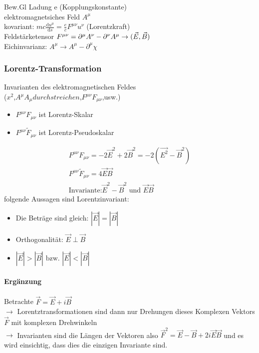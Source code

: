\documentclass[a4paper]{article}
\begin{document}
Bew.Gl
Ladung e (Kopplungskonstante)\\
elektromagnetsiches Feld $A^\mu$\\
kovariant: $mc\frac{\mathrm{d}u^\mu}{\mathrm{d}s}=\frac{e}{c} F^{\mu\nu} u^\nu$ (Lorentzkraft)\\
Feldstärketensor $F^{\mu\nu}=\partial^\mu A^\nu-\partial^\nu A^\mu \\
\rightarrow (\vec{E},\vec{B})$\\
Eichinvarianz: $A^\mu\rightarrow A^\mu-\partial^\mu\chi$\\
\subsubsection{Lorentz-Transformation}
Invarianten des elektromagnetischen Feldes\\
($x^2$,$A^\mu A_\mu durchstreichen$,$F^{\mu\nu}F_{\mu\nu}$,usw.)\\
\begin{itemize}
  \item $F^{\mu\nu}F_{\mu\nu}$ ist Lorentz-Skalar
  \item $F^{\mu\nu}\tilde{F}_{\mu\nu}$ ist Lorentz-Pseudoskalar
\end{itemize}
\begin{align}
F^{\mu\nu}F_{\mu\nu}=-2\vec{E}^2+2\vec{B}^2=-2(\vec{E^2}-\vec{B}^2)\\
F^{\mu\nu}\tilde{F}_{\mu\nu}=4\vec{E}\vec{B}\\
\text{Invariante:} \vec{E}^2-\vec{B}^2 \text{ und } \vec{E}\vec{B}
\end{align}
folgende Aussagen sind Lorentzinvariant:
\begin{itemize}
  \item Die Beträge sind gleich: $|\vec{E}|=|\vec{B}|$
  \item Orthogonalität: $\vec{E} \perp \vec{B}$
  \item $|\vec{E}|>|\vec{B}| \text{ bzw. } |\vec{E}|<|\vec{B}|$
\end{itemize}
\paragraph{Ergänzung}
Betrachte $\vec{F}=\vec{E}+i\vec{B}$\\
$\rightarrow$ Lorentztransformationen sind dann nur Drehungen dieses Komplexen
Vektors $\vec{F}$ mit komplexen Drehwinkeln\\
$\rightarrow$ Invarianten sind die Längen der Vektoren also
$\vec{F}^2=\vec{E}-\vec{B}+2i\vec{E}\vec{B}$ und es wird einsichtig, dass dies
die einzigen Invariante sind.
\end{document}
